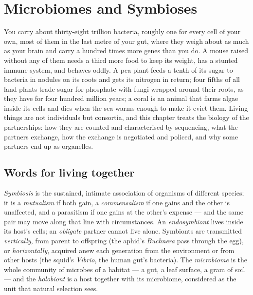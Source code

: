 \chapter{Microbiomes and Symbioses}\label{ch:b3:microbiomes}

You carry about thirty-eight trillion bacteria, roughly one for every
cell of your own, most of them in the last metre of your gut, where
they weigh about as much as your brain and carry a hundred times more
genes than you do. A mouse raised without any of them needs a third
more food to keep its weight, has a stunted immune system, and behaves
oddly. A pea plant feeds a tenth of its sugar to bacteria in nodules on
its roots and gets its nitrogen in return; four fifths of all land
plants trade sugar for phosphate with fungi wrapped around their roots,
as they have for four hundred million years; a coral is an animal that
farms algae inside its cells and dies when the sea warms enough to make
it evict them. Living things are not individuals but consortia, and
this chapter treats the biology of the partnerships: how they are
counted and characterised by sequencing, what the partners exchange,
how the exchange is negotiated and policed, and why some partners end
up as organelles.

\section{Words for living together}

\begin{definition}[Symbiosis]\label{def:b3:microbiomes:symbiosis}
\emph{Symbiosis} is the sustained, intimate association of organisms of
different species; it is a \emph{mutualism} if both gain, a
\emph{commensalism} if one gains and the other is unaffected, and a
parasitism if one gains at the other's expense --- and the same pair
may move along that line with circumstances. An \emph{endosymbiont}
lives inside its host's cells; an \emph{obligate} partner cannot live
alone. Symbionts are transmitted \emph{vertically}, from parent to
offspring (the aphid's \emph{Buchnera} pass through the egg), or
\emph{horizontally}, acquired anew each generation from the environment
or from other hosts (the squid's \emph{Vibrio}, the human gut's
bacteria). The \emph{microbiome} is the whole community of microbes of
a habitat --- a gut, a leaf surface, a gram of soil --- and the
\emph{holobiont} is a host together with its microbiome, considered as
the unit that natural selection sees.
\end{definition}

